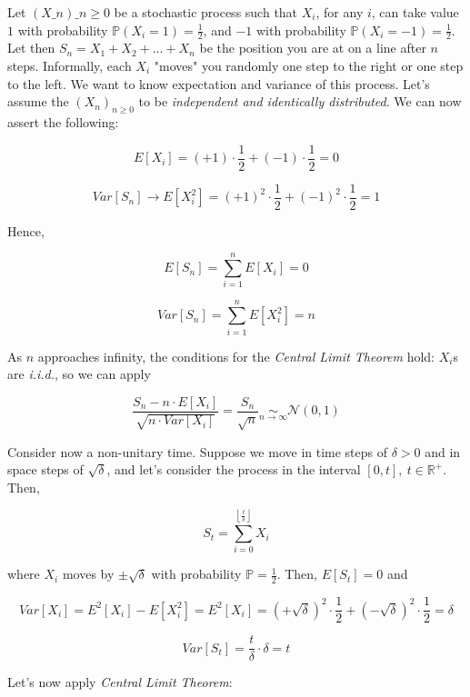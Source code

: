 \documentclass[twoside,openright,titlepage,headinclude,12pt,a4paper,BCOR5mm,footinclude]{book}
\theoremstyle{definition}
\begin{document}
  Let   $(X\_n)\_{n   \geq    0}$   be   a   stochastic    process   such   that
  \(X_i\),   for   any   \(i\),   can  take   value   \(1\)   with   probability
  \(\mathbb{P}(X_i=1)=\frac{1}{2}\),     and     \(-1\)     with     probability
  \(\mathbb{P}(X_i=-1)=\frac{1}{2}\). Let then \(S_n = X_1 + X_2 + \ldots +X_n\)
  be the  position you  are at  on a  line after  \(n\) steps.  Informally, each
  \(X_i\) "moves" you randomly one step to the right or one step to the left. We
  want  to know  expectation  and variance  of this  process.  Let's assume  the
  \((X_n)_{n \geq  0}\) to be \textit{independent  and identically distributed}.
  We can now assert the following:

  \[
    E\left[X_i\right] = (+1) \cdot \frac{1}{2} + (-1) \cdot \frac{1}{2} = 0
  \]
    
  \[
    Var\left[S_n\right] \to E\left[X_i^2\right] = (+1)^2 \cdot \frac{1}{2} + (-1)^2 \cdot \frac{1}{2} = 1
  \]

  Hence,

  \[
    E\left[S_n\right] = \sum_{i=1}^n E\left[X_i\right] = 0
  \]

  \[
    Var\left[S_n\right] = \sum_{i=1}^n E\left[X_i^2\right] = n
  \]

  As \(n\)  approaches infinity,  the conditions  for the  \textit{Central Limit
  Theorem} hold: \(X_i\)s are \textit{i.i.d.}, so we can apply

  \[
    \frac{S_n - n \cdot E\left[X_i\right]}{\sqrt{n \cdot Var\left[X_i\right]}}
    = \frac{S_n}{\sqrt{n}} \underset{n \to \infty}{\sim} \mathcal{N}(0,1)
  \]

  Consider now a non-unitary  time. Suppose we move in time  steps of \(\delta >
  0\) and in space steps of \(\sqrt{\delta}\), and let's consider the process in
  the interval $[0,t],\ t\in\mathbb{R}^+$. Then,

  \[
    S_t = \sum_{i=0}^{\left\lfloor \frac{t}{\delta} \right\rfloor} X_i
  \]

  where     $X_i$     moves     by     $\pm\sqrt\delta$     with     probability
  $\mathbb{P}=\frac{1}{2}$. Then, $E\left[S_t\right]=0$ and

  \[
    Var[X_i] = E^2[X_i] - E[X_i^2] = E^2[X_i] = (+\sqrt{\delta})^2 \cdot \frac{1}{2} + (-\sqrt{\delta})^2 \cdot \frac{1}{2} 
      = \delta
  \]

  \[
    Var[S_t] = \frac{t}{\delta} \cdot \delta = t
  \]

  Let's now apply \textit{Central Limit Theorem}:
\end{document}

